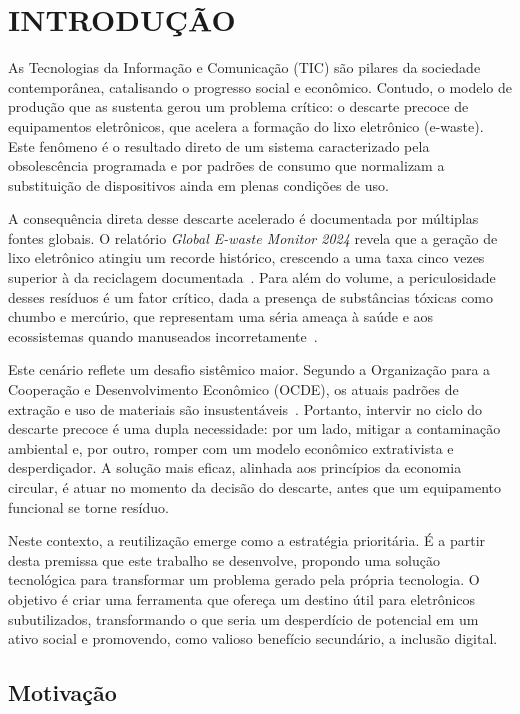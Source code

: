 \documentclass[
	12pt,				%
	openright,			%
	oneside,			%
	a4paper,			%
	english,			%
	brazil				%
	]{abntex2}
\theoremstyle{definition}
\begin{document}
\chapter[Introdução]{INTRODUÇÃO}

As Tecnologias da Informação e Comunicação (TIC) são pilares da sociedade contemporânea, catalisando o progresso social e econômico. Contudo, o modelo de produção que as sustenta gerou um problema crítico: o descarte precoce de equipamentos eletrônicos, que acelera a formação do lixo eletrônico (e-waste). Este fenômeno é o resultado direto de um sistema caracterizado pela obsolescência programada e por padrões de consumo que normalizam a substituição de dispositivos ainda em plenas condições de uso.

A consequência direta desse descarte acelerado é documentada por múltiplas fontes globais. O relatório \textit{Global E-waste Monitor 2024} revela que a geração de lixo eletrônico atingiu um recorde histórico, crescendo a uma taxa cinco vezes superior à da reciclagem documentada~\cite{forti2024}. Para além do volume, a periculosidade desses resíduos é um fator crítico, dada a presença de substâncias tóxicas como chumbo e mercúrio, que representam uma séria ameaça à saúde e aos ecossistemas quando manuseados incorretamente~\cite{perkins2014}.

Este cenário reflete um desafio sistêmico maior. Segundo a Organização para a Cooperação e Desenvolvimento Econômico (OCDE), os atuais padrões de extração e uso de materiais são insustentáveis~\cite{oecd2019}. Portanto, intervir no ciclo do descarte precoce é uma dupla necessidade: por um lado, mitigar a contaminação ambiental e, por outro, romper com um modelo econômico extrativista e desperdiçador. A solução mais eficaz, alinhada aos princípios da economia circular, é atuar no momento da decisão do descarte, antes que um equipamento funcional se torne resíduo.

Neste contexto, a reutilização emerge como a estratégia prioritária. É a partir desta premissa que este trabalho se desenvolve, propondo uma solução tecnológica para transformar um problema gerado pela própria tecnologia. O objetivo é criar uma ferramenta que ofereça um destino útil para eletrônicos subutilizados, transformando o que seria um desperdício de potencial em um ativo social e promovendo, como valioso benefício secundário, a inclusão digital.

\section[Motivação]{Motivação}
\end{document}
